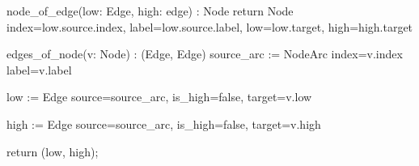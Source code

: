 \begin{blstlisting}[language=pseudo]
  node_of_edge(low: Edge, high: edge) : Node
      return Node {
        index=low.source.index,
        label=low.source.label,
        low=low.target,
        high=high.target
      }

  edges_of_node(v: Node) : (Edge, Edge)
      source_arc := NodeArc{
        index=v.index
        label=v.label
      }
  
      low := Edge {
        source=source_arc,
        is_high=false,
        target=v.low
      }

      high := Edge {
        source=source_arc,
        is_high=false,
        target=v.high        
      }
      
      return (low, high);
\end{blstlisting}
